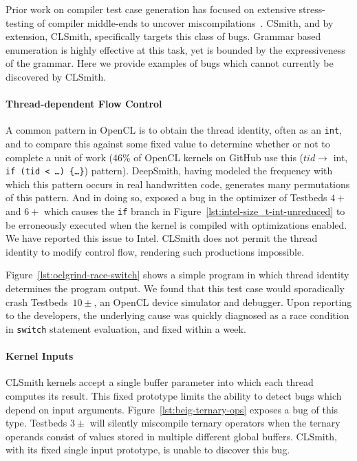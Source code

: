 Prior work on compiler test case generation has focused on extensive stress-testing of compiler middle-ends to uncover miscompilations~\cite{Chen2014a}. CSmith, and by extension, CLSmith, specifically targets this class of bugs. Grammar based enumeration is highly effective at this task, yet is bounded by the expressiveness of the grammar. Here we provide examples of bugs which cannot currently be discovered by CLSmith.

\paragraph{Thread-dependent Flow Control} A common pattern in OpenCL is to obtain the thread identity, often as an \texttt{int}, and to compare this against some fixed value to determine whether or not to complete a unit of work (46\% of OpenCL kernels on GitHub use this ($tid \rightarrow$ int, \texttt{if (tid < \ldots) \{\ldots\}}) pattern). DeepSmith, having modeled the frequency with which this pattern occurs in real handwritten code, generates many permutations of this pattern. And in doing so, exposed a bug in the optimizer of Testbeds $4+$ and $6+$ which causes the \texttt{if} branch in Figure~\ref{lst:intel-size_t-int-unreduced} to be erroneously executed when the kernel is compiled with optimizations enabled. We have reported this issue to Intel. CLSmith does not permit the thread identity to modify control flow, rendering such productions impossible.

Figure~\ref{lst:oclgrind-race-switch} shows a simple program in which thread identity determines the program output. We found that this test case would sporadically crash Testbeds~$10\pm$, an OpenCL device simulator and debugger. Upon reporting to the developers, the underlying cause was quickly diagnosed as a race condition in \texttt{switch} statement evaluation, and fixed within a week.

\paragraph{Kernel Inputs} CLSmith kernels accept a single buffer parameter into which each thread computes its result. This fixed prototype limits the ability to detect bugs which depend on input arguments. Figure~\ref{lst:beig-ternary-ops} exposes a bug of this type. Testbeds $3\pm$ will silently miscompile ternary operators when the ternary operands consist of values stored in multiple different global buffers. CLSmith, with its fixed single input prototype, is unable to discover this bug. %

